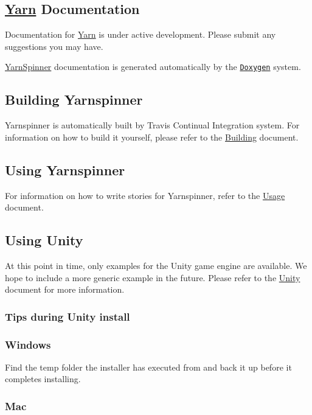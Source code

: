 \subsection*{\hyperlink{a00026}{Yarn} Documentation}

Documentation for \hyperlink{a00026}{Yarn} is under active development. Please submit any suggestions you may have.

\hyperlink{a00156}{Yarn\-Spinner} documentation is generated automatically by the \href{http://www.doxygen.org}{\tt Doxygen} system.

\subsection*{Building Yarnspinner}

Yarnspinner is automatically built by Travis Continual Integration system. For information on how to build it yourself, please refer to the \hyperlink{a00096}{Building} document.

\subsection*{Using Yarnspinner}

For information on how to write stories for Yarnspinner, refer to the \hyperlink{a00101}{Usage} document.

\subsection*{Using Unity}

At this point in time, only examples for the Unity game engine are available. We hope to include a more generic example in the future. Please refer to the \hyperlink{a00100}{Unity} document for more information.

\subsubsection*{Tips during Unity install}

\subsubsection*{Windows}

Find the temp folder the installer has executed from and back it up before it completes installing.

\subsubsection*{Mac}

